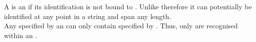 A  is an  if its identification is not bound to . Unlike  therefore it can potentially be identified at any point in a string and span any length. \\

Any  specified by an  can only contain  specified by . Thus, only  are recognised within an .


